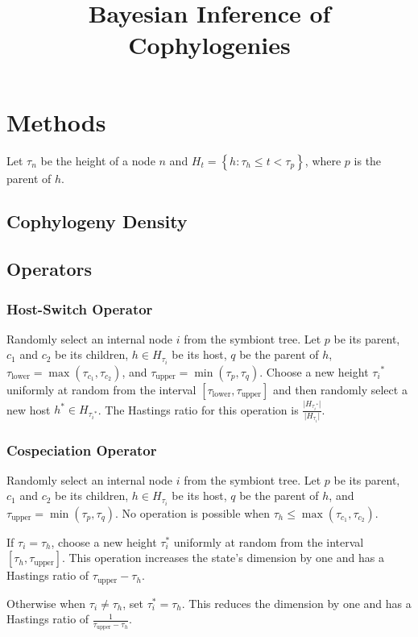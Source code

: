 \documentclass{article}
\title{Bayesian Inference of Cophylogenies}
\begin{document}
    \section*{Methods}
       
        Let $\tau_n$ be the height of a node $n$ and $H_t = \left\{h : \tau_h 
        \leq t < \tau_p\right\}$, where $p$ is the parent of $h$.

        \subsection*{Cophylogeny Density}

        \subsection*{Operators}
            
            \subsubsection*{Host-Switch Operator}
                
                Randomly select an internal node $i$ from the symbiont tree. 
                Let $p$ be its parent, $c_1$ and $c_2$ be its children, $h \in 
                H_{\tau_i}$ be its host, $q$ be the parent of $h$, 
                $\tau_\text{lower} = \max\left(\tau_{c_1},\tau_{c_2}\right)$, 
                and $\tau_\text{upper} = \min\left(\tau_p,\tau_q\right)$. 
                Choose a new height ${\tau_i}^*$ uniformly at random from 
                the interval $\left[\tau_\text{lower}, 
                \tau_\text{upper}\right]$ and then randomly select a new host 
                $h^* \in H_{{\tau_i}^*}$. The Hastings ratio for this 
                operation is $\frac{\lvert{H_{{\tau_i}^*}}\rvert}
                {\lvert{H_{\tau_i}}\rvert}$.

            \subsubsection*{Cospeciation Operator}
                
                Randomly select an internal node $i$ from the symbiont tree.
                Let $p$ be its parent, $c_1$ and $c_2$ be its children, $h \in 
                H_{\tau_i}$ be its host, $q$ be the parent of $h$, and 
                $\tau_\text{upper} = \min\left(\tau_p,\tau_q\right)$. No 
                operation is possible when $\tau_h \leq 
                \max\left(\tau_{c_1},\tau_{c_2}\right)$.
               
                If $\tau_i = \tau_h$, choose a new height $\tau_i^*$ uniformly 
                at random from the interval $\left[\tau_h, 
                \tau_\text{upper}\right]$. This operation increases the state's 
                dimension by one and has a Hastings ratio of $\tau_\text{upper} 
                - \tau_h$.
               
                Otherwise when $\tau_i \neq \tau_h$, set $\tau_i^* = \tau_h$. 
                This reduces the dimension by one and has a Hastings ratio of 
                $\frac{1}{\tau_\text{upper} - \tau_h}$.
\end{document}
